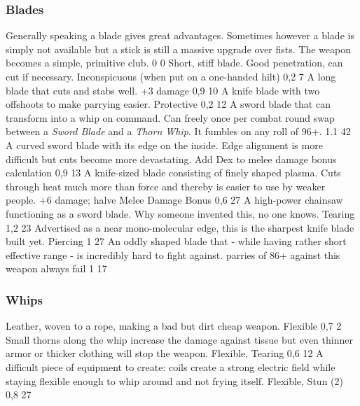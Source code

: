 \subsubsection{Blades}
\vspace{8mm}
\begin{multicols}{2}
    {Generally speaking a blade gives great advantages.
        Sometimes however a blade is simply not available but a stick is still a massive upgrade over fists.}
    {The weapon becomes a simple, primitive club.}
    {0}
    {0}
    {}
    {Short, stiff blade. Good penetration, can cut if necessary.}
    {
    	Inconspicuous (when put on a one-handed hilt)
	}{0,2}
    {7}
    {}
    {A long blade that cuts and stabs well.}
    {+3 damage}
    {0,9}
    {10}
    {}
    {A knife blade with two offshoots to make parrying easier.}
    {Protective}
    {0,2}
    {12}
    {}
	{A sword blade that can transform into a whip on command.}
	{
		Can freely once per combat
		round swap between a \emph{Sword Blade} and a \emph{Thorn Whip}.
		It fumbles on any roll of 96+.
	}
	{1.1}
	{42}
	{}
    {A curved sword blade with its edge on the inside.
        Edge alignment is more difficult but cuts become more devastating.}
    {Add Dex to melee damage bonus calculation}
    {0,9}
    {13}
    {}
    {A knife-sized blade consisting of finely shaped plasma.
        Cuts through heat much more than force and thereby is easier to use by weaker people.}
    {+6 damage; halve Melee Damage Bonus}
    {0,6}
    {27}
    {}
    {A high-power chainsaw functioning as a sword blade.
        Why someone invented this, no one knows.}
    {Tearing}
    {1,2}
    {23}
    {}
    {Advertised as a near mono-molecular edge,
        this is the sharpest knife blade built yet.}
    {Piercing}
    {1}
    {27}
    {}
    {An oddly shaped blade that
        - while having rather short effective range
        - is incredibly hard to fight against.}
    {parries of 86+ against this weapon always fail}
    {1}
    {17}
    {}
\end{multicols}

\subsubsection{Whips}
\vspace{8mm}
\begin{multicols}{2}
    {Leather, woven to a rope, making a bad but dirt cheap weapon.}
    {Flexible}
    {0,7}
    {2}
    {}
    {Small thorns along the whip increase the damage against tissue
        but even thinner armor or thicker clothing will stop the weapon.}
    {Flexible, Tearing}
    {0,6}
    {12}
    {}
    {A difficult piece of equipment to create:
        coils create a strong electric field while staying flexible enough to whip around
        and not frying itself.}
    {Flexible, Stun (2)}
    {0,8}
    {27}
    {}
\end{multicols}

